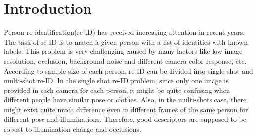 \documentclass[conference,compsoc]{IEEEtran}
\begin{document}




%
\IEEEpeerreviewmaketitle



\section{Introduction}
Person re-identification(re-ID) has received increasing attention in recent years. The task of re-ID is to match a given person with a list of identities with known labels. This problem is very challenging caused by many factors like low image resolution, occlusion, background noise and different camera color response, etc. According to sample size of each person, re-ID can be divided into single shot and multi-shot re-ID. In the single shot re-ID problem, since only one image is provided in each camera for each person, it might be quite confusing when different people have similar pose or clothes. Also, in the multi-shots case, there might exist quite much difference even in different frames of the same person for different pose and illuminations. Therefore, good descriptors are supposed to be robust to illumination change and occlusions.
\end{document}
